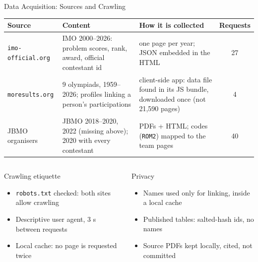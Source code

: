 \documentclass[aspectratio=169]{beamer}
\begin{document}
\begin{frame}{Data Acquisition: Sources and Crawling}
  \footnotesize
  \setlength{\tabcolsep}{4pt}
  \begin{tabular}{L{2.8cm}L{4.8cm}L{5.4cm}c}
    \toprule
    \textbf{Source} & \textbf{Content} & \textbf{How it is collected} & \textbf{Requests} \\
    \midrule
    \texttt{imo-official.org} & IMO 2000--2026: problem scores, rank, award,
      official contestant id
      & one page per year; JSON embedded in the HTML & 27 \\[2pt]
    \texttt{moresults.org} & 9 olympiads, 1959--2026; profiles linking a
      person's participations
      & client-side app: data file found in its JS bundle, downloaded once
        (not 21,590 pages) & 4 \\[2pt]
    JBMO organisers & JBMO 2018--2020, 2022 (missing above); 2020 with every
      contestant
      & PDFs + HTML; codes (\texttt{ROM2}) mapped to the team pages & 40 \\
    \bottomrule
  \end{tabular}

  \vspace{6pt}
  \begin{columns}[T]
      \begin{block}{Crawling etiquette}
        \footnotesize
        \begin{itemize}\setlength{\itemsep}{2pt}
          \item \texttt{robots.txt} checked: both sites allow crawling
          \item Descriptive user agent, 3 s between requests
          \item Local cache: no page is requested twice
        \end{itemize}
      \end{block}
      \begin{block}{Privacy}
        \footnotesize
        \begin{itemize}\setlength{\itemsep}{2pt}
          \item Names used only for linking, inside a local cache
          \item Published tables: salted-hash ids, no names
          \item Source PDFs kept locally, cited, not committed
        \end{itemize}
      \end{block}
  \end{columns}
\end{frame}
\end{document}
